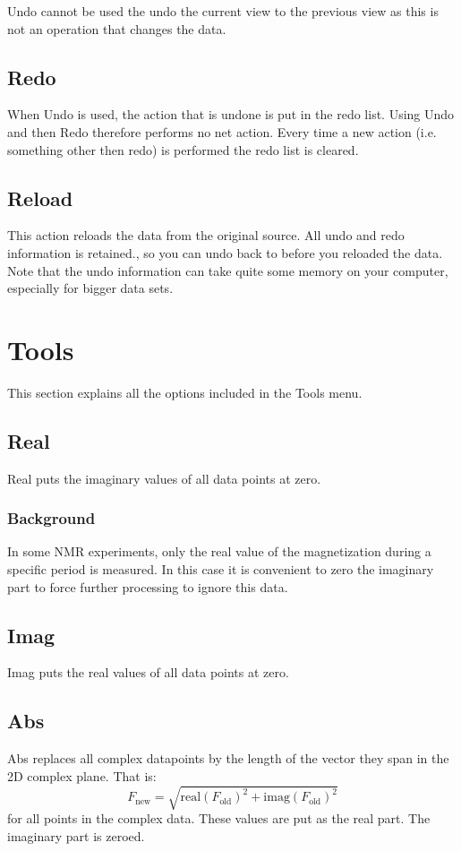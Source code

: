 \documentclass[11pt,a4paper]{article}
\begin{document}
Undo cannot be used the undo the current view to the previous view as this is not an operation that changes the data.

\subsection{Redo}
When Undo is used, the action that is undone is put in the redo list. Using Undo and then Redo therefore performs no net action. Every time a new action (i.e. something other then redo) is performed the redo list is cleared.

\subsection{Reload}
This action reloads the data from the original source. All undo and redo information is retained., so you can undo back to before you reloaded the data. Note that the undo information can take quite some memory on your computer, especially for bigger data sets.

\section{Tools}
This section explains all the options included in the Tools menu. 

\subsection{Real}
Real puts the imaginary values of all data points at zero.

\subsubsection*{Background}
In some NMR experiments, only the real value of the magnetization during a specific period is measured. In this case it is convenient to zero the imaginary part to force further processing to ignore this data.


\subsection{Imag}
Imag puts the real values of all data points at zero.

\subsection{Abs}
Abs replaces all complex datapoints by the length of the vector they span in the 2D complex plane. That is:
\begin{equation*}
F_\text{new} = \sqrt{\text{real}(F_\text{old})^2 + \text{imag}(F_\text{old})^2}
\end{equation*}
for all points in the complex data. These values are put as the real part. The imaginary part is zeroed.
\end{document}
